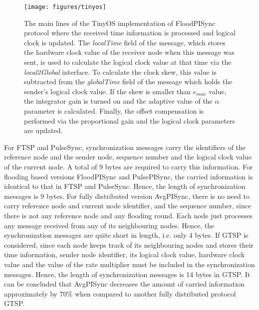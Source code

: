 \documentclass[english,a4paper,10pt,final]{article}
\numberwithin{equation}{section}
\numberwithin{figure}{section}
\begin{document}
\begin{figure}

\center

\texttt{[image: figures/tinyos]}


\caption{\label{fig:tinyos} The main lines of the TinyOS implementation of FloodPISync protocol where the received time information is processed and logical clock is updated. The \textit{localTime} field of the message, which stores the hardware clock value of the receiver node when this message was sent, is used to calculate the logical clock value at that time via the \textit{local2Global} interface. To calculate the clock skew, this value is subtracted from the \textit{globalTime} field of the message which holds the sender's logical clock value. If the skew is smaller than $e_{max}$ value, the integrator gain is turned on and the adaptive value of the $\alpha$ parameter is calculated. Finally, the offset compensation is performed via the proportional gain and the logical clock parameters are updated.}
\end{figure}

For FTSP and PulseSync, synchronization messages carry the identifiers of the reference node and the sender node, sequence number and the logical clock value of the current node. A total of 9 bytes are required to carry this information. For flooding based versions FloodPISync and PulsePISync, the carried information is identical to that in FTSP and PulseSync. Hence, the length of synchronization messages is 9 bytes. For fully distributed version AvgPISync, there is no need to carry reference node and current node identifier, and the sequence number, since there is not any reference node and any flooding round. Each node just processes any message received from any of its neighbouring nodes. Hence, the synchronization messages are quite short in length, i.e. only 4 bytes. If GTSP is considered, since each node keeps track of its neighbouring nodes and stores their time information, sender node identifier, its logical clock value, hardware clock value and the value of the rate multiplier must be included in the synchronization messages. Hence, the length of synchronization messages is 14 bytes in GTSP. It can be concluded that AvgPISync decreases the amount of carried information approximately by 70\%  when compared to another fully distributed protocol GTSP. 
\end{document}
